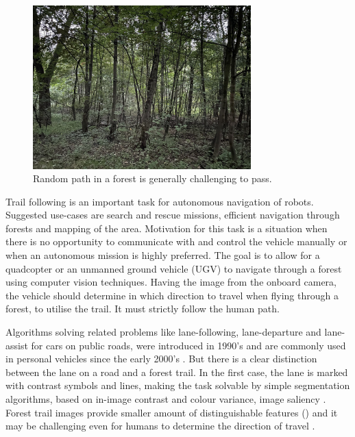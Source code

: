 \begin{figure}[!h]
  \centering
  \includegraphics[width=0.75\textwidth]{./fig/photos/challenging_path.jpg}

  \caption{Random path in a forest is generally challenging to pass.}
  \label{fig:challenging_path}
\end{figure}

Trail following is an important task for autonomous navigation of robots. Suggested use-cases are search and rescue missions, efficient navigation through forests and mapping of the area. Motivation for this task is a situation when there is no opportunity to communicate with and control the vehicle manually or when an autonomous mission is highly preferred. The goal is to allow for a quadcopter or an unmanned ground vehicle (UGV) to navigate through a forest using computer vision techniques. Having the image from the onboard camera, the vehicle should determine in which direction to travel when flying through a forest, to utilise the trail. It must strictly follow the human path.

Algorithms solving related problems like lane-following, lane-departure and lane-assist for cars on public roads, were introduced in 1990's \cite{batavia1999driver} and are commonly used in personal vehicles since the early 2000's \cite{chen2020lane}. But there is a clear distinction between the lane on a road and a forest trail. In the first case, the lane is marked with contrast symbols and lines, making the task solvable by simple segmentation algorithms, based on in-image contrast and colour variance, image saliency \cite{santana2013tracking}. Forest trail images provide smaller amount of distinguishable features () and it may be challenging even for humans to determine the direction of travel \cite{giusti2016machine}.

